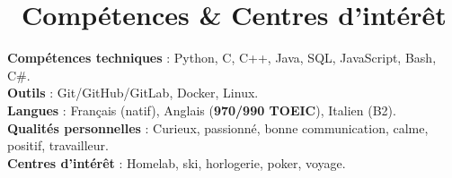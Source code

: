 \documentclass[letterpaper,11pt]{article}
\begin{document}
\section*{\small \faTools\ \large Compétences \& Centres d’intérêt}
\begin{itemize}[leftmargin=0.15in, label={}]
  \small{\item{
    \textbf{Compétences techniques}{ : Python, C, C++, Java, SQL, JavaScript, Bash, C\#.} \\
    \textbf{Outils}{ : Git/GitHub/GitLab, Docker, Linux.} \\
    \textbf{Langues}{ : Français (natif), Anglais (\textbf{970/990 TOEIC}), Italien (B2).} \\
    \textbf{Qualités personnelles}{ : Curieux, passionné, bonne communication, calme, positif, travailleur.} \\
    \textbf{Centres d’intérêt}{ : Homelab, ski, horlogerie, poker, voyage.}
  }}
\end{itemize}
\end{document}
